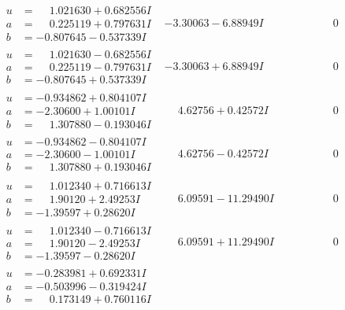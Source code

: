 \documentclass[1p]{elsarticle_modified}
\theoremstyle{definition}
\begin{document}
$$\begin{array}{c|c|c}
\begin{aligned}
u &= \phantom{-}1.021630 + 0.682556 I \\
a &= \phantom{-}0.225119 + 0.797631 I \\
b &= -0.807645 - 0.537339 I\end{aligned}
 & -3.30063 - 6.88949 I & \phantom{-0.000000 } 0 \\ \hline\begin{aligned}
u &= \phantom{-}1.021630 - 0.682556 I \\
a &= \phantom{-}0.225119 - 0.797631 I \\
b &= -0.807645 + 0.537339 I\end{aligned}
 & -3.30063 + 6.88949 I & \phantom{-0.000000 } 0 \\ \hline\begin{aligned}
u &= -0.934862 + 0.804107 I \\
a &= -2.30600 + 1.00101 I \\
b &= \phantom{-}1.307880 - 0.193046 I\end{aligned}
 & \phantom{-}4.62756 + 0.42572 I & \phantom{-0.000000 } 0 \\ \hline\begin{aligned}
u &= -0.934862 - 0.804107 I \\
a &= -2.30600 - 1.00101 I \\
b &= \phantom{-}1.307880 + 0.193046 I\end{aligned}
 & \phantom{-}4.62756 - 0.42572 I & \phantom{-0.000000 } 0 \\ \hline\begin{aligned}
u &= \phantom{-}1.012340 + 0.716613 I \\
a &= \phantom{-}1.90120 + 2.49253 I \\
b &= -1.39597 + 0.28620 I\end{aligned}
 & \phantom{-}6.09591 - 11.29490 I & \phantom{-0.000000 } 0 \\ \hline\begin{aligned}
u &= \phantom{-}1.012340 - 0.716613 I \\
a &= \phantom{-}1.90120 - 2.49253 I \\
b &= -1.39597 - 0.28620 I\end{aligned}
 & \phantom{-}6.09591 + 11.29490 I & \phantom{-0.000000 } 0 \\ \hline\begin{aligned}
u &= -0.283981 + 0.692331 I \\
a &= -0.503996 - 0.319424 I \\
b &= \phantom{-}0.173149 + 0.760116 I\end{aligned}

\end{array}$$
\end{document}
